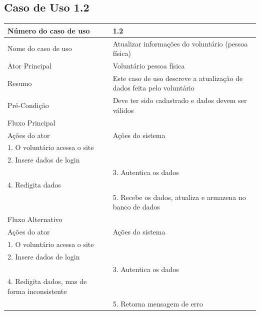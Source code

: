   \subsection{Caso de Uso 1.2}
    \begin{table}[h]
    \begin{center}
    \begin{tabular}{|p{5cm}|p{10cm}|}
      \hline
      Número do caso de uso & 1.2\\
      \hline
      Nome do caso de uso & Atualizar informações do voluntário (pessoa física)\\
      \hline
      Ator Principal & Voluntário pessoa física\\
      \hline
      Resumo & Este caso de uso descreve a atualização de dados feita pelo voluntário\\
      \hline
      Pré-Condição & Deve ter sido cadastrado e dados devem ser válidos\\
      \hline
      Fluxo Principal & \\
      \hline
      Ações do ator & Ações do sistema \\
      \hline
      1. O voluntário acessa o site & \\
      \hline
      2. Insere dados de login & \\
      \hline
       & 3. Autentica os dados\\
      \hline
      4. Redigita dados & \\
      \hline
      & 5. Recebe os dados, atualiza e armazena no banco de dados\\
      \hline
      Fluxo Alternativo & \\
      \hline
      Ações do ator & Ações do sistema\\
      \hline
      1. O voluntário acessa o site & \\
      \hline
      2. Insere dados de login & \\
      \hline
       & 3. Autentica os dados\\
      \hline
      4. Redigita dados, mas de forma inconsistente & \\
      \hline
      & 5. Retorna mensagem de erro\\
      \hline
    \end{tabular}
    \end{center}
    \end{table}

